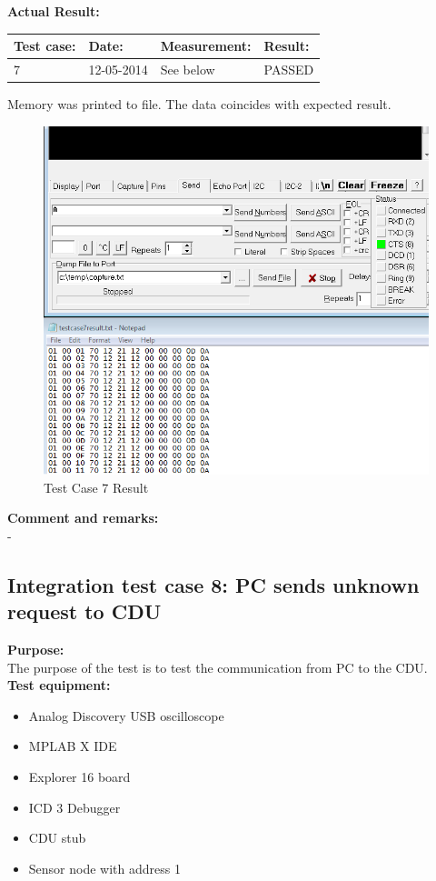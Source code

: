 \textbf{Actual Result:}\\
\begin{table}[H]
\centering
\begin{tabular}{|p{2cm}|p{2cm}|p{3cm}|p{2cm}|}\hline
\textbf{Test case:} & \textbf{Date:} & \textbf{Measurement:} & \textbf{Result:} \\ \hline
7 & 12-05-2014 & See below & PASSED \\ \hline
\end{tabular}
\end{table}
Memory was printed to file. The data coincides with expected result.
\begin{figure}[H]
\centering
\includegraphics[width=1\textwidth]{billeder/inte07}
\caption{Test Case 7 Result}
\label{fig:InteTestCase7}
\end{figure}

\textbf{Comment and remarks:}\\
-\\

\subsection{Integration test case 8: PC sends unknown request to CDU}
\textbf{Purpose:}\\
The purpose of the test is to test the communication from PC to the CDU.\\

\textbf{Test equipment:}
\begin{itemize}
\item Analog Discovery USB oscilloscope
\item MPLAB X IDE
\item Explorer 16 board
\item ICD 3 Debugger
\item CDU stub
\item Sensor node with address 1
\end{itemize}

